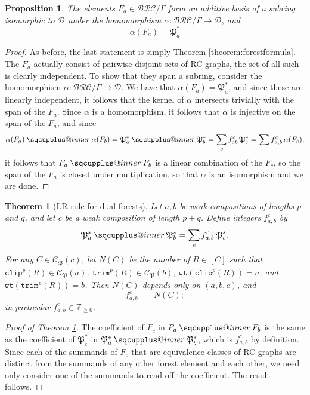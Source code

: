 \documentclass{amsart}
\makeatletter
\newcommand{\sqcupplus@inner}[2]{%
  \vcenter{\hbox{\ooalign{%
    \hfil$\m@th#1\sqcup$\hfil\cr
    \hfil\raisebox{0.15ex}{$\m@th#1\scriptscriptstyle+$}\hfil\cr
  }}}%
}
\newcommand{\sqcupplus}{\mathbin{\mathpalette\sqcupplus@inner\relax}}
\newtheorem{proposition}[lemma]{Proposition}
\newtheorem{theorem}{Theorem}[section]
\theoremstyle{definition}
\theoremstyle{remark}
\numberwithin{equation}{subsection}
\newcommand{\wtt}{\mathtt{wt}}
\newcommand{\trm}{\mathtt{trim}}
\newcommand{\clp}{\mathtt{clip}}
\newcommand{\BRC}{\mathcal{BRC}}
\newcommand{\dcoma}{\mathcal{D}}
\newcommand{\forest}{\mathfrak{P}}
\makeatother
\begin{document}
\begin{proposition}
The elements $F_a\in\BRC/\Gamma$ form an additive basis of a subring isomorphic to $\dcoma$ under the homomorphism $\alpha:\BRC/\Gamma\to \dcoma$, and 
$$\alpha(F_a) = \forest_a^*$$
\end{proposition}
\begin{proof}
As before, the last statement is simply Theorem \ref{theorem:forestformula}. The $F_a$ actually consist of pairwise disjoint sets of RC graphs, the set of all such is clearly independent. To show that they span a subring, consider the homomorphism $\alpha:\BRC/\Gamma\to \dcoma$. We have that $\alpha(F_a)=\forest_a^*$, and since these are linearly independent, it follows that the kernel of $\alpha$ intersects trivially with the span of the $F_a$. Since $\alpha$ is a homomorphism, it follows that $\alpha$ is injective on the span of the $F_a$, and since 
$$\alpha(F_a)\sqcupplus\alpha(F_b) = \forest_a^*\sqcupplus\forest_b^*=\sum_{c}f_{ab}^c\,\forest_c^*=\sum f_{a,b}^c\,\alpha(F_c),$$ 
it follows that $F_a\sqcupplus F_b$ is a linear combination of the $F_c$, so the span of the $F_a$ is closed under multiplication, so that $\alpha$ is an isomorphism and we are done.
\end{proof}

\begin{theorem}[LR rule for dual forests]\label{theorem:LRforest}
Let $a,b$ be weak compositions of lengths $p$ and $q$, and let $c$ be a weak composition of length $p+q$. Define integers $f_{a,b}^c$ by
$$\forest_a^* \sqcupplus \forest_b^* = \sum_{c} f_{a,b}^c\,\forest_c^*.$$
For any $C\in\mathcal{C}_\forest(c)$, let $N(C)$ be the number of $R\in[C]$ such that $\clp^p(R)\in \mathcal{C}_\forest(a)$, $\trm^p(R)\in \mathcal{C}_\forest(b)$, $\wtt(\clp^p(R))=a$, and $\wtt(\trm^p(R))=b$. Then $N(C)$ depends only on $(a,b,c)$, and
$$f_{a,b}^c \;=\; N(C);$$
in particular $f_{a,b}^c\in\mathbb{Z}_{\geq 0}$.
\end{theorem}

\begin{proof}[Proof of Theorem \ref{theorem:LRforest}]
  The coefficient of $F_c$ in $F_a\sqcupplus F_b$ is the same as the coefficient of $\forest_c^*$ in $\forest_a^*\sqcupplus\forest_b^*$, which is $f_{a,b}^c$ by definition. Since each of the summands of $F_c$ that are equivalence classes of RC graphs are distinct from the summands of any other forest element and each other, we need only consider one of the summands to read off the coefficient. The result follows.
\end{proof}
\end{document}
